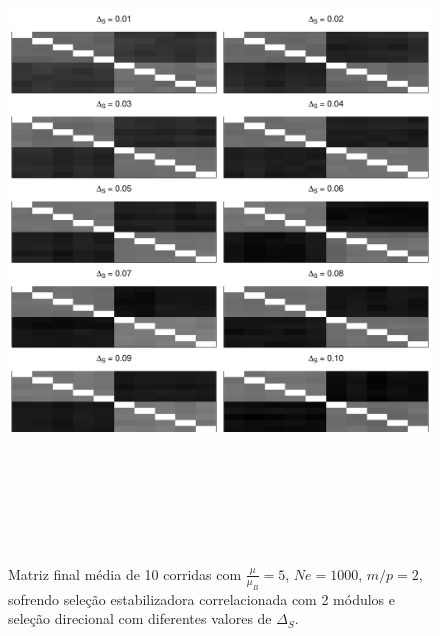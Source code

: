 \begin{center}
\begin{figure}[htbp]
  \includegraphics[width=150mm, height=180mm]{figuras/MatBDirecionalIntSel110}
   \caption{Matriz final média de 10 corridas com
   $\frac{\mu}{\mu_B} = 5$, $Ne = 1000$, $m/p=2$, sofrendo seleção estabilizadora correlacionada com 2
   módulos e seleção direcional com diferentes valores de $\Delta_S$.}
  \label{MatBIntSel110}
\end{figure}
\end{center}


